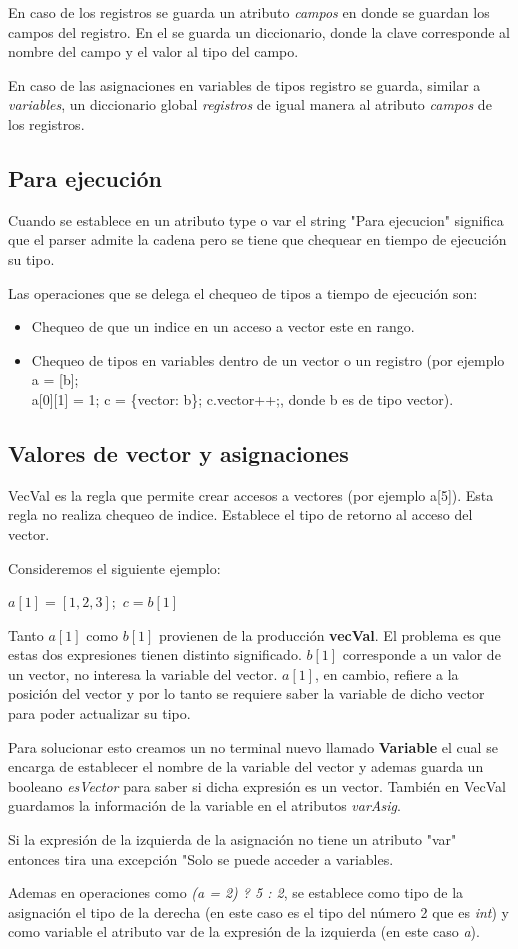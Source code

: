 En caso de los registros se guarda un atributo \textit{campos} en donde se guardan los campos del registro. En el se guarda un diccionario, donde la clave corresponde al nombre del campo y el valor al tipo del campo.

En caso de las asignaciones en variables de tipos registro se guarda, similar a \textit{variables}, un diccionario global \textit{registros} de igual manera al atributo \textit{campos} de los registros.

\subsection{Para ejecución}
Cuando se establece en un atributo type o var el string "Para ejecucion" significa que el parser admite la cadena pero se tiene que chequear en tiempo de ejecución su tipo. 

Las operaciones que se delega el chequeo de tipos a tiempo de ejecución son:

\begin{itemize}
\item Chequeo de que un indice en un acceso a vector este en rango.
\item Chequeo de tipos en variables dentro de un vector o un registro (por ejemplo a = [b]; \\ a[0][1] = 1; c = \{vector: b\}; c.vector++;, donde b es de tipo vector).

\end{itemize}

\subsection{Valores de vector y asignaciones}
VecVal es la regla que permite crear accesos a vectores (por ejemplo a[5]). Esta regla no realiza chequeo de indice. Establece el tipo de retorno al acceso del vector.

Consideremos el siguiente ejemplo:

$ a[1] = [1,2,3];$
$ c = b[1] $

Tanto $ a[1]$ como $ b[1]$ provienen de la producción \textbf{vecVal}. El problema es que estas dos expresiones tienen distinto significado. $ b[1]$ corresponde a un valor de un vector, no interesa la variable del vector. $ a[1]$, en cambio, refiere a la posición del vector y por lo tanto se requiere saber la variable de dicho vector para poder actualizar su tipo.

Para solucionar esto creamos un no terminal nuevo llamado \textbf{Variable} el cual se encarga de establecer el nombre de la variable del vector y ademas guarda un booleano \textit{esVector} para saber si dicha expresión es un vector. También en VecVal guardamos la información de la variable en el atributos \textit{varAsig}.

Si la expresión de la izquierda de la asignación no tiene un atributo "var" entonces tira una excepción "Solo se puede acceder a variables.

Ademas en operaciones como \textit{(a = 2) ? 5 : 2}, se establece como tipo de la asignación el tipo de la derecha (en este caso es el tipo del número 2 que es \textit{int}) y como variable el atributo var de la expresión de la izquierda (en este caso \textit{a}).

